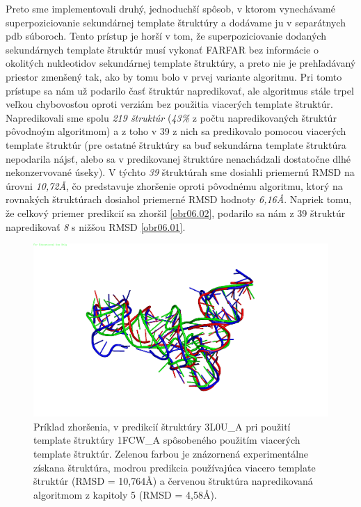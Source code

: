 \indent Preto sme implementovali druhý, jednoduchší spôsob, v ktorom vynechávamé superpoziciovanie sekundárnej template štruktúry a dodávame ju v separátnych pdb súboroch. Tento prístup je horší v tom, že superpoziciovanie dodaných sekundárnych template štruktúr musí vykonať FARFAR bez informácie o okolitých nukleotidov sekundárnej template štruktúry, a preto nie je prehľadávaný priestor zmenšený tak, ako by tomu bolo v prvej variante algoritmu. Pri tomto prístupe sa nám už podarilo časť štruktúr napredikovať, ale algoritmus stále trpel veľkou chybovosťou oproti verziám bez použitia viacerých template štruktúr. Napredikovali sme spolu \textit{219 štruktúr} (\textit{43\%} z počtu napredikovaných štruktúr pôvodnoým algoritmom) a z toho v 39 z nich sa predikovalo pomocou viacerých template štruktúr (pre ostatné štruktúry sa buď sekundárna template štruktúra nepodarila nájsť, alebo sa v predikovanej štruktúre nenachádzali dostatočne dlhé nekonzervované úseky). V týchto \textit{39} štruktúrah sme dosiahli priemernú RMSD na úrovni \textit{10,72Å}, čo predstavuje zhoršenie oproti pôvodnému algoritmu, ktorý na rovnakých štruktúrach dosiahol priemerné RMSD hodnoty \textit{6,16Å}. Napriek tomu, že celkový priemer predikcií sa zhoršil \autoref{obr06.02}, podarilo sa nám z 39 štruktúr napredikovať \textit{8}  s nižšou RMSD \autoref{obr06.01}.

\begin{figure}%
\includegraphics[width=\textwidth]{../img/loss}
\caption{Príklad zhoršenia, v predikcií štruktúry 3L0U\_A pri použití template štruktúry 1FCW\_A spôsobeného použitím viacerých template štruktúr. Zelenou farbou je znázornená experimentálne získana štruktúra, modrou predikcia používajúca viacero template štruktúr (RMSD = 10,764Å) a červenou štruktúra napredikovaná algoritmom z kapitoly 5 (RMSD = 4,58Å). }
\label{obr06.02}
\end{figure}

